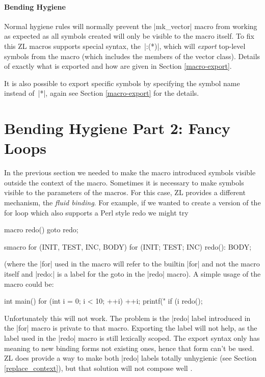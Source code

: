 \paragraph{Bending Hygiene}
\label{macro-export-intro}

Normal hygiene rules will normally prevent the |mk_vector| macro from
working as expected as all symbols created will only be visible to the
macro itself.  To fix this ZL macros supports special syntax,
the~|:(*)|, which will \textit{export} top-level symbols from the
macro (which includes the members of the vector class).  Details of
exactly what is exported and how are given in Section
\ref{macro-export}.

It is also possible to export specific symbols by specifying the symbol
name instead of~|*|, again see Section \ref{macro-export} for the details.

\section{Bending Hygiene Part 2: Fancy Loops}
\label{fluid-intro}

In the previous section we needed to make the macro introduced symbols
visible outside the context of the macro.  Sometimes it is necessary
to make symbols visible to the parameters of the macros.  For this
case, ZL provides a different mechanism, the \textit{fluid binding}.
For example, if we wanted to create a version of the for loop which
also supports a Perl style redo we might try
\begin{code}
macro redo() {goto redo;}

smacro for (INIT, TEST, INC, BODY) {
  for (INIT; TEST; INC) {
    redo():
    BODY;
  }
}
\end{code}
(where the |for| used in the macro will refer to the builtin |for| and
not the macro itself and |redo:| is a label for the goto in the |redo|
macro).  A simple usage of the macro could be:

\begin{code}
int main() {
  for (int i = 0; i < 10; ++i) {
    ++i;
    printf("%
    if (i %
      redo();
  }
}
\end{code}

Unfortunately this will not work.  The problem is the |redo| label
introduced in the |for| macro is private to that macro.  Exporting the
label will not help, as the label used in the |redo| macro is still
lexically scoped.  The export syntax only has meaning to new binding
forms not existing ones, hence that form can't be used.  ZL does provide a
way to make both |redo| labels totally unhygienic (see Section
\ref{replace_context}), but that solution will not compose well \cite{syn-parm}.

